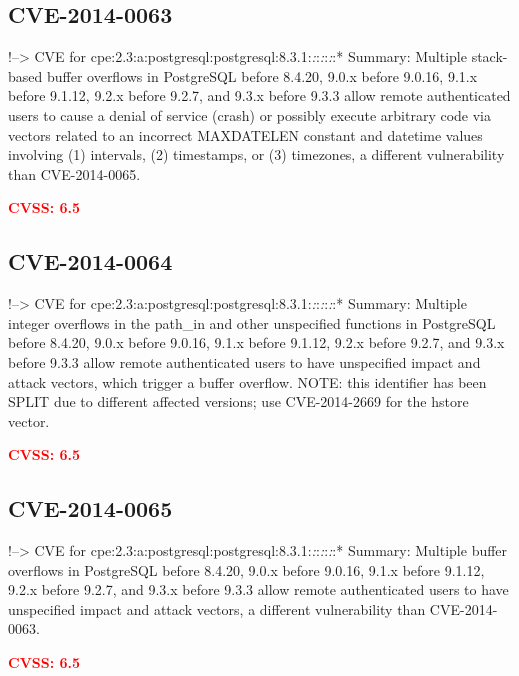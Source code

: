 \documentclass[a4paper, 12pt]{article}
\begin{document}
\hypertarget{cve-2014-0063}{%
\subsection{CVE-2014-0063}\label{cve-2014-0063}}

!--\textgreater{} CVE for
cpe:2.3:a:postgresql:postgresql:8.3.1:\emph{:}:\emph{:}:\emph{:}:*
Summary: Multiple stack-based buffer overflows in PostgreSQL before
8.4.20, 9.0.x before 9.0.16, 9.1.x before 9.1.12, 9.2.x before 9.2.7,
and 9.3.x before 9.3.3 allow remote authenticated users to cause a
denial of service (crash) or possibly execute arbitrary code via vectors
related to an incorrect MAXDATELEN constant and datetime values
involving (1) intervals, (2) timestamps, or (3) timezones, a different
vulnerability than CVE-2014-0065.

\textbf{\textcolor{red}{CVSS: 6.5}}

\hypertarget{cve-2014-0064}{%
\subsection{CVE-2014-0064}\label{cve-2014-0064}}

!--\textgreater{} CVE for
cpe:2.3:a:postgresql:postgresql:8.3.1:\emph{:}:\emph{:}:\emph{:}:*
Summary: Multiple integer overflows in the path\_in and other
unspecified functions in PostgreSQL before 8.4.20, 9.0.x before 9.0.16,
9.1.x before 9.1.12, 9.2.x before 9.2.7, and 9.3.x before 9.3.3 allow
remote authenticated users to have unspecified impact and attack
vectors, which trigger a buffer overflow. NOTE: this identifier has been
SPLIT due to different affected versions; use CVE-2014-2669 for the
hstore vector.

\textbf{\textcolor{red}{CVSS: 6.5}}

\hypertarget{cve-2014-0065}{%
\subsection{CVE-2014-0065}\label{cve-2014-0065}}

!--\textgreater{} CVE for
cpe:2.3:a:postgresql:postgresql:8.3.1:\emph{:}:\emph{:}:\emph{:}:*
Summary: Multiple buffer overflows in PostgreSQL before 8.4.20, 9.0.x
before 9.0.16, 9.1.x before 9.1.12, 9.2.x before 9.2.7, and 9.3.x before
9.3.3 allow remote authenticated users to have unspecified impact and
attack vectors, a different vulnerability than CVE-2014-0063.

\textbf{\textcolor{red}{CVSS: 6.5}}
\end{document}
